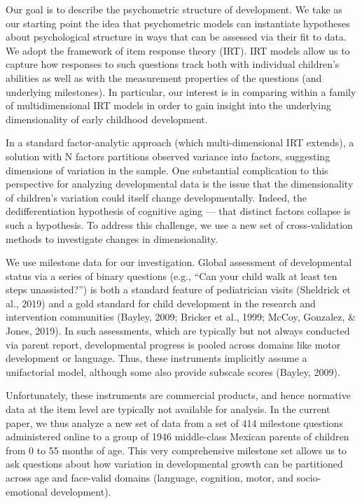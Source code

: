 \documentclass[10pt, letterpaper]{article}
\begin{document}
Our goal is to describe the psychometric structure of development. We
take as our starting point the idea that psychometric models can
instantiate hypotheses about psychological structure in ways that can be
assessed via their fit to data. We adopt the framework of item response
theory (IRT). IRT models allow us to capture how responses to such
questions track both with individual children's abilities as well as
with the measurement properties of the questions (and underlying
milestones). In particular, our interest is in comparing within a family
of multidimensional IRT models in order to gain insight into the
underlying dimensionality of early childhood development.

In a standard factor-analytic approach (which multi-dimensional IRT
extends), a solution with N factors partitions observed variance into
factors, suggesting dimensions of variation in the sample. One
substantial complication to this perspective for analyzing developmental
data is the issue that the dimensionality of children's variation could
itself change developmentally. Indeed, the dedifferentiation hypothesis
of cognitive aging --- that distinct factors collapse is such a
hypothesis. To address this challenge, we use a new set of
cross-validation methods to investigate changes in dimensionality.

We use milestone data for our investigation. Global assessment of
developmental status via a series of binary questions (e.g., ``Can your
child walk at least ten steps unassisted?'') is both a standard feature
of pediatrician visits (Sheldrick et al., 2019) and a gold standard for
child development in the research and intervention communities (Bayley,
2009; Bricker et al., 1999; McCoy, Gonzalez, \& Jones, 2019). In such
assessments, which are typically but not always conducted via parent
report, developmental progress is pooled across domains like motor
development or language. Thus, these instruments implicitly assume a
unifactorial model, although some also provide subscale scores (Bayley,
2009).

Unfortunately, these instruments are commercial products, and hence
normative data at the item level are typically not available for
analysis. In the current paper, we thus analyze a new set of data from a
set of 414 milestone questions administered online to a group of 1946
middle-class Mexican parents of children from 0 to 55 months of age.
This very comprehensive milestone set allows us to ask questions about
how variation in developmental growth can be partitioned across age and
face-valid domains (language, cognition, motor, and socio-emotional
development).
\end{document}
